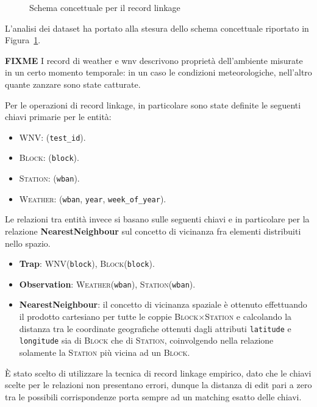 \begin{figure}[H]
    \centering
    \def\svgwidth{\columnwidth}
    \scalebox{.5}{
        
    }
    \caption{Schema concettuale per il record linkage}
    \label{fig:er-schema}
\end{figure}

L'analisi dei dataset ha portato alla stesura dello schema concettuale 
riportato in Figura~\ref{fig:er-schema}. 

\textbf{FIXME} I record di weather e wnv descrivono proprietà dell'ambiente 
misurate in un certo momento temporale: in un caso le condizioni 
meteorologiche, nell'altro quante zanzare sono state catturate.

Per le operazioni di record linkage, 
in particolare sono state definite le seguenti chiavi primarie per le entità:

\begin{itemize}
    \item \textsc{WNV}: (\texttt{test\_id}).

    \item \textsc{Block}: (\texttt{block}).
    
    \item \textsc{Station}: (\texttt{wban}).
    
    \item \textsc{Weather}: (\texttt{wban}, \texttt{year}, 
    \texttt{week\_of\_year}).

\end{itemize}


Le relazioni tra entità invece si basano sulle seguenti chiavi e in particolare 
per la relazione \textbf{NearestNeighbour} sul concetto di vicinanza fra 
elementi distribuiti nello spazio.

\begin{itemize}
    \item \textbf{Trap}: \textsc{WNV}(\texttt{block}), 
    \textsc{Block}(\texttt{block}).

    \item \textbf{Observation}:  \textsc{Weather}(\texttt{wban}), 
    \textsc{Station}(\texttt{wban}).
    
    \item \textbf{NearestNeighbour}: il concetto di vicinanza spaziale è 
    ottenuto effettuando il prodotto cartesiano per tutte le coppie
    \textsc{Block}$\times$\textsc{Station} e calcolando la distanza tra le 
    coordinate geografiche ottenuti dagli attributi \texttt{latitude} e 
    \texttt{longitude} sia di \textsc{Block} che di \textsc{Station},
    coinvolgendo nella relazione solamente la \textsc{Station} più vicina ad 
    un \textsc{Block}.

\end{itemize}

È stato scelto di utilizzare la tecnica di record linkage empirico, dato che 
le chiavi scelte per le relazioni non presentano errori, dunque la distanza di 
edit pari a zero tra le possibili corrispondenze porta sempre ad un matching 
esatto delle chiavi.
